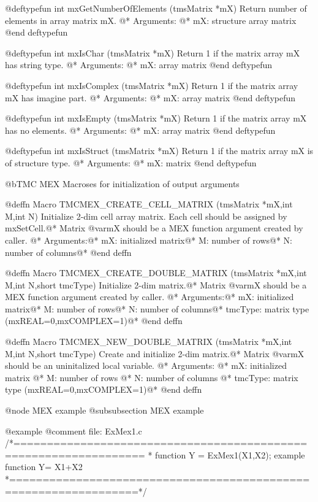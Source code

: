 @deftypefun        int mxGetNumberOfElements (tmsMatrix *mX) 
Return number of elements in array matrix mX. @*
Arguments: @*
	mX: structure array matrix
@end deftypefun	


@deftypefun         int mxIsChar (tmsMatrix *mX) 
Return 1 if the matrix array mX has string type. @*
Arguments: @*
	mX:  array matrix
@end deftypefun


@deftypefun        int mxIsComplex (tmsMatrix *mX) 
Return 1 if the matrix array mX has imagine part. @*
Arguments: @*
	mX:  array matrix
@end deftypefun
	

@deftypefun         int mxIsEmpty (tmsMatrix *mX) 
Return 1 if the matrix array mX has no elements. @*
Arguments: @*
	mX:  array matrix
@end deftypefun	



@deftypefun         int mxIsStruct (tmsMatrix *mX) 
Return 1 if the matrix array mX is of structure type. @*
Arguments: @*
	mX:  matrix
@end deftypefun	


@b{TMC MEX Macroses for initialization of output arguments}

@deffn {Macro} TMCMEX_CREATE_CELL_MATRIX (tmsMatrix *mX,int M,int N)
Initialize 2-dim cell array matrix. Each cell should be assigned by mxSetCell.@*
Matrix @var{mX} should be a MEX function argument created by caller. @*
Arguments:@*
	mX: initialized matrix@*
	M: number of rows@*
	N: number of columns@*
@end deffn	


@deffn {Macro}    TMCMEX_CREATE_DOUBLE_MATRIX (tmsMatrix *mX,int M,int N,short tmcType) 
Initialize 2-dim matrix.@*
Matrix @var{mX} should be a MEX function argument created by caller. @*
Arguments:@*
	mX: initialized matrix@*
	M: number of rows@*
	N: number of columns@*
	tmcType: matrix type (mxREAL=0,mxCOMPLEX=1)@*
@end deffn	
	
@deffn {Macro}     TMCMEX_NEW_DOUBLE_MATRIX (tmsMatrix *mX,int M,int N,short tmcType) 
Create and initialize 2-dim matrix.@*
Matrix @var{mX} should be an uninitalized local variable. @*
Arguments: @*
	mX: initialized matrix @*
	M: number of rows @*
	N: number of columns @*
	tmcType: matrix type (mxREAL=0,mxCOMPLEX=1)@*
@end deffn		
	
@node MEX example
@subsubsection MEX example

@example
@comment file: ExMex1.c
/*================================================================= 
 * function Y = ExMex1(X1,X2);
 example function
						Y= X1+X2
 *=================================================================*/

